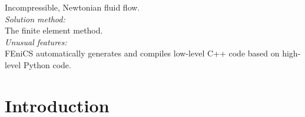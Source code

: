 \documentclass[final,3p,times,twocolumn]{elsarticle}
\begin{document}
\begin{small}
  Incompressible, Newtonian fluid flow.
   \\
{\em Solution method:}\\
  The finite element method.
   \\
{\em Unusual features:}\\
  FEniCS automatically generates and compiles low-level C++ code based on high-level Python code.
   \\

\end{small}


\section{Introduction}
\label{sec:introduction}


\end{document}
